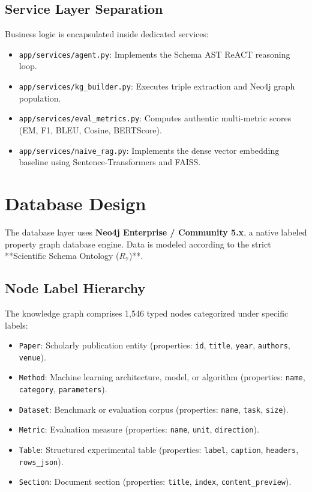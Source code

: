 \subsection{Service Layer Separation}
Business logic is encapsulated inside dedicated services:
\begin{itemize}
    \item \texttt{app/services/agent.py}: Implements the Schema AST ReACT reasoning loop.
    \item \texttt{app/services/kg\_builder.py}: Executes triple extraction and Neo4j graph population.
    \item \texttt{app/services/eval\_metrics.py}: Computes authentic multi-metric scores (EM, F1, BLEU, Cosine, BERTScore).
    \item \texttt{app/services/naive\_rag.py}: Implements the dense vector embedding baseline using Sentence-Transformers and FAISS.
\end{itemize}

\section{Database Design}
The database layer uses \textbf{Neo4j Enterprise / Community 5.x}, a native labeled property graph database engine. Data is modeled according to the strict **Scientific Schema Ontology ($R_7$)**.

\subsection{Node Label Hierarchy}
The knowledge graph comprises 1,546 typed nodes categorized under specific labels:
\begin{itemize}
    \item \texttt{Paper}: Scholarly publication entity (properties: \texttt{id}, \texttt{title}, \texttt{year}, \texttt{authors}, \texttt{venue}).
    \item \texttt{Method}: Machine learning architecture, model, or algorithm (properties: \texttt{name}, \texttt{category}, \texttt{parameters}).
    \item \texttt{Dataset}: Benchmark or evaluation corpus (properties: \texttt{name}, \texttt{task}, \texttt{size}).
    \item \texttt{Metric}: Evaluation measure (properties: \texttt{name}, \texttt{unit}, \texttt{direction}).
    \item \texttt{Table}: Structured experimental table (properties: \texttt{label}, \texttt{caption}, \texttt{headers}, \texttt{rows\_json}).
    \item \texttt{Section}: Document section (properties: \texttt{title}, \texttt{index}, \texttt{content\_preview}).
\end{itemize}

